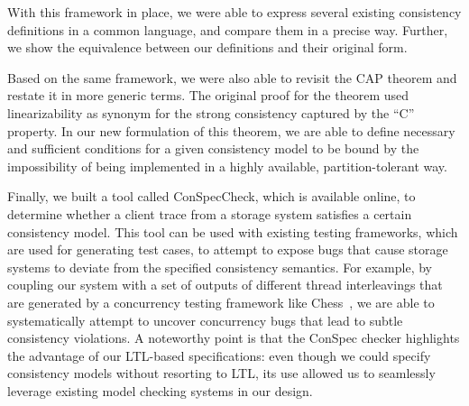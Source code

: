 \documentclass[journal, compsoc]{IEEEtran}
\begin{document}
	
	With this framework in place, we were able to express several existing
	consistency definitions in a common language, and compare them in a precise
	way. Further, we show the equivalence between our definitions and  their original form. %
	
	Based on the same framework, we were also able to revisit the CAP theorem \cite{brew:cap, Gilbert:2002:BCF:564585.564601} and restate it in more generic terms. The original proof for the theorem used linearizability as synonym for the strong consistency captured by the ``C'' property. In our new formulation of this theorem, we are able to define necessary and sufficient conditions for a given consistency model to be bound by the impossibility of being implemented in a highly available, partition-tolerant way.
	
	Finally, we built a tool called ConSpecCheck, which is available online, to %
	determine whether a client trace from a storage system satisfies a certain consistency model.
	This tool can be used with existing testing frameworks, which are used for generating test cases, to attempt to expose bugs that cause storage systems to deviate from the specified consistency semantics. For example, by coupling our system with a set of outputs of different thread interleavings that are generated by a concurrency testing framework like Chess~\cite{Musuvathi:2008:SCT:1390841.1390851}, we are able to systematically attempt to uncover concurrency bugs that lead to subtle consistency violations.
	A noteworthy point is that the ConSpec checker highlights the advantage of our LTL-based specifications: even though we could specify consistency models without resorting to LTL, its use allowed us to seamlessly leverage existing model checking systems in our design.
	
\end{document}
